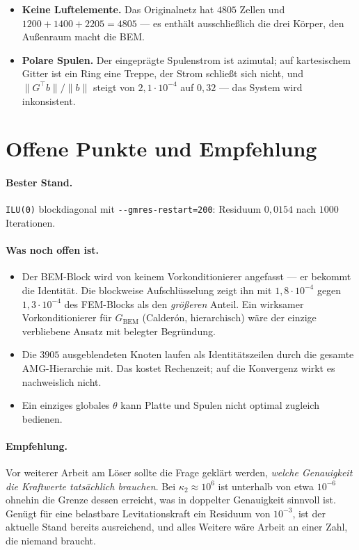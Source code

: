 \documentclass[11pt,a4paper]{article}
\newcommand{\code}[1]{\texttt{\small #1}}
\newcommand{\kappazwei}{\kappa_2}
\begin{document}
\begin{itemize}
\item \textbf{Keine Luftelemente.} Das Originalnetz hat $4805$ Zellen und
  $1200+1400+2205 = 4805$ --- es enthält ausschließlich die drei Körper, den
  Außenraum macht die BEM.
\item \textbf{Polare Spulen.} Der eingeprägte Spulenstrom ist azimutal; auf
  kartesischem Gitter ist ein Ring eine Treppe, der Strom schließt sich nicht,
  und $\|G^{\!\top}b\|/\|b\|$ steigt von $2{,}1\cdot10^{-4}$ auf $0{,}32$ ---
  das System wird inkonsistent.
\end{itemize}

\section{Offene Punkte und Empfehlung}

\paragraph{Bester Stand.} \code{ILU(0)} blockdiagonal mit
\code{-{}-gmres-restart=200}: Residuum $0{,}0154$ nach $1000$ Iterationen.

\paragraph{Was noch offen ist.}
\begin{itemize}
\item Der BEM-Block wird von keinem Vorkonditionierer angefasst --- er bekommt
  die Identität. Die blockweise Aufschlüsselung zeigt ihn mit $1{,}8\cdot10^{-4}$
  gegen $1{,}3\cdot10^{-4}$ des FEM-Blocks als den \emph{größeren} Anteil. Ein
  wirksamer Vorkonditionierer für $G_{\mathrm{BEM}}$ (Calderón, hierarchisch)
  wäre der einzige verbliebene Ansatz mit belegter Begründung.
\item Die $3905$ ausgeblendeten Knoten laufen als Identitätszeilen durch die
  gesamte AMG-Hierarchie mit. Das kostet Rechenzeit; auf die Konvergenz wirkt
  es nachweislich nicht.
\item Ein einziges globales $\theta$ kann Platte und Spulen nicht optimal
  zugleich bedienen.
\end{itemize}

\paragraph{Empfehlung.} Vor weiterer Arbeit am Löser sollte die Frage geklärt
werden, \emph{welche Genauigkeit die Kraftwerte tatsächlich brauchen}. Bei
$\kappazwei\approx10^{6}$ ist unterhalb von etwa $10^{-6}$ ohnehin die Grenze
dessen erreicht, was in doppelter Genauigkeit sinnvoll ist. Genügt für eine
belastbare Levitationskraft ein Residuum von $10^{-3}$, ist der aktuelle Stand
bereits ausreichend, und alles Weitere wäre Arbeit an einer Zahl, die niemand
braucht.
\end{document}
